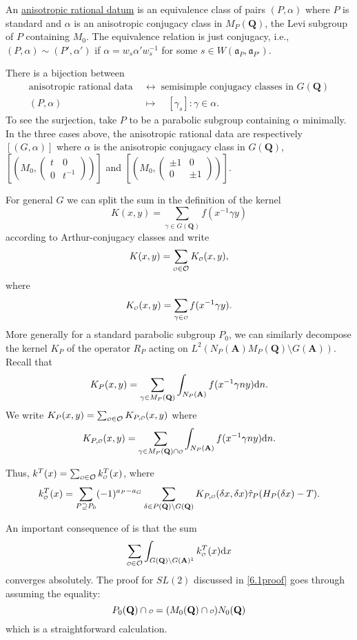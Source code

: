 \documentclass{ims9x6}
\def\apg{a_{P} - a_{G}}
\def\A{\mathbf A}
\def\Q{\mathbf Q}
\def\O{\mathcal O}
\def\o{\scalebox{0.7}{$\scriptstyle\mathcal{O}$}}
\def\aaa{\mathfrak a}
\def\d{\text d}
\def\bs{\setminus}
\def\Ltwo{L^2}
\begin{document}
An \underline{anisotropic rational datum} is an equivalence class of pairs $(P, \alpha)$ where $P$ is standard and $\alpha$ is an anisotropic conjugacy class in $M_P(\Q)$, the Levi subgroup of $P$ containing $M_0$. The equivalence relation is just conjugacy, i.e., $(P, \alpha) \sim (P', \alpha')$ if $\alpha = w_s \alpha' w_s^{-1}$ for some $s \in W(\aaa_P, \aaa_{P'})$. 

There is a bijection between 
\begin{align*}
	\text{anisotropic rational data} \; & \leftrightarrow \; \text{semisimple conjugacy classes in } G(\Q) \\
	(P, \alpha) \quad & \mapsto \quad [\gamma_s] : \gamma \in \alpha.
\end{align*}
To see the surjection, take $P$ to be a parabolic subgroup containing $\alpha$ minimally. In the three cases above, the anisotropic rational data are respectively $[(G, \alpha)]$ where $\alpha$ is the anisotropic conjugacy class in $G(\Q)$, $\left[ \left(M_0, \begin{pmatrix} t & 0 \\ 0 & t^{-1} \end{pmatrix} \right) \right]$ and $\left[ \left(M_0, \begin{pmatrix} \pm 1 & 0 \\ 0 & \pm 1 \end{pmatrix} \right)\right]$.

For general $G$ we can split the sum in the definition of the kernel
\[ K(x, y) = \sum_{\gamma \in G(\Q)} f(x^{-1} \gamma y) \]
according to Arthur-conjugacy classes and write
\[ K(x, y) = \sum_{\o \in \O} K_{\o}(x, y),\]
where
\[ K_{\o}(x, y) = \sum_{\gamma \in \o} f(x^{-1}\gamma y). \]
More generally for a standard parabolic subgroup $P_0$, we can similarly decompose the kernel $K_P$ of the operator $R_P$ acting on $\Ltwo(N_P(\A) M_P(\Q)\bs G(\A))$. Recall that
\[ K_P(x, y) = \sum_{\gamma \in M_P(\Q)} \int_{N_P(\A)} f(x^{-1} \gamma n y) \d n. \]
We write $K_P(x, y) = \sum_{\o \in \O} K_{P, \o} (x, y)$ where
\[ K_{P, \o}(x, y) = \sum_{\gamma \in M_P(\Q) \cap \o} \int_{N_P(\A)} f(x^{-1} \gamma n y) \d n. \]

Thus, $k^T(x) = \sum_{\o \in \O} k^T_{\o}(x)$, where
\[ k^T_{\o}(x) = \sum_{P \supseteq P_0} (-1)^{\apg} \sum_{\delta\in P(\Q)\bs G(\Q)} K_{P, \o}(\delta x, \delta x) \hat\tau_P(H_P(\delta x) - T). \]

An important consequence of \cite[Theorem~6.1]{clay} is that the sum 
\begin{equation}
	\sum_{\o \in \O} \int_{G(\Q) \bs G(\A)^1} k_{\o}^T(x) \d x 
\end{equation}
converges absolutely. The proof for $SL(2)$ discussed in \cref{6.1proof} goes through assuming the equality:
\[ P_0(\Q) \cap \o = (M_0(\Q) \cap \o) N_0(\Q) \]
which is a straightforward calculation.
\end{document}
